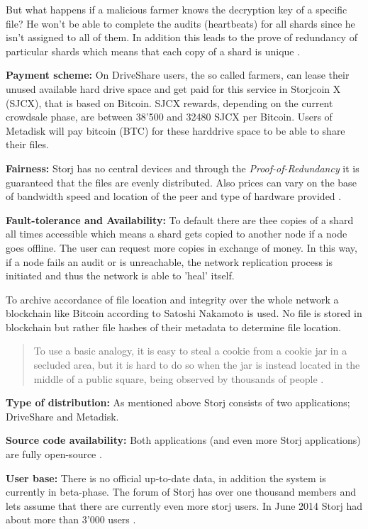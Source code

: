 But what happens if a malicious farmer knows the decryption key of a specific file? He won't be able to complete the audits (heartbeats) for all shards since he isn't assigned to all of them. In addition this leads to the prove of redundancy of particular shards which means that each copy of a shard is unique \cite{storj:PDF}.

\textbf{Payment scheme:} On DriveShare users, the so called farmers, can lease their unused available hard drive space and get paid for this service in Storjcoin X (SJCX), that is based on Bitcoin. SJCX rewards, depending on the current crowdsale phase, are between 38'500 and 32480 SJCX per Bitcoin\cite{storj:crowdsale}. Users of Metadisk will pay bitcoin (BTC) for these harddrive space to be able to share their files.

\textbf{Fairness:} Storj has no central devices and through the \textit{Proof-of-Redundancy} it is guaranteed that the files are evenly distributed. Also prices can vary on the base of bandwidth speed and location of the peer and type of hardware provided \cite{storj:PDF}.

\textbf{Fault-tolerance and Availability:} To default there are thee copies of a shard all times accessible which means a shard gets copied to another node if a node goes offline. The user can request more copies in exchange of money. In this way, if a node fails an audit or is unreachable, the network replication process is initiated and thus the network is able to 'heal' itself.

To archive accordance of file location and integrity over the whole network a blockchain like Bitcoin according to Satoshi Nakamoto \cite{bitcoin} is used. No file is stored in blockchain but rather file hashes of their metadata to determine file location.

\begin{quotation}
To use a basic analogy, it is easy to steal a cookie from a cookie jar in a secluded area, but it is hard to do so when the jar is instead located in the middle of a public square, being observed by thousands of people \cite{storj:PDF}.
\end{quotation}

\textbf{Type of distribution:} As mentioned above Storj consists of two applications; DriveShare and Metadisk.

\textbf{Source code availability:} Both applications (and even more Storj applications) are fully open-source \cite{storj:github}.

\textbf{User base:} There is no official up-to-date data, in addition the system is currently in beta-phase. The forum of Storj has over one thousand members \cite{storj:forum} and lets assume that there are currently even more storj users. In June 2014 Storj had about more than 3'000 users \cite{storj:crowdsale}.

